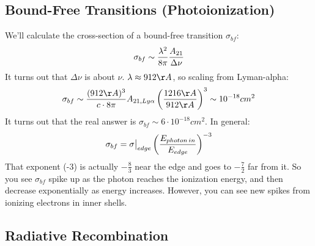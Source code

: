 \documentclass[11pt]{article}
\def\eval#1{\big|_{#1}}
\begin{document}
\subsection*{ Bound-Free Transitions (Photoionization)}

\def\sigbf{\sigma_{bf}}
We'll calculate the cross-section of a bound-free transition $\sigbf$:
$$\sigbf\sim{\lambda^2\over 8\pi}{A_{21}\over \Delta\nu}$$
It turns out that $\Delta\nu$ is about $\nu$. $\lambda\approx 912\AA$, 
so scaling from Lyman-alpha:
$$\sigbf\sim{(912\AA)^3\over c\cdot8\pi}A_{21,Ly\alpha}
\left({1216\AA\over912\AA}\right)^3\sim 10^{-18}cm^2$$
It turns out that the real answer is $\sigbf\sim 6\cdot 10^{-18}cm^2$.  In
general:
$$\sigbf=\sigma\eval{edge}\left({E_{photon\,in}\over E_{edge}}\right)^{-3}$$
That exponent (-3) is actually $-\frac83$ near the edge and goes to $-\frac72$
far from it.  So you see $\sigbf$ spike up as the photon reaches the 
ionization energy, and then decrease exponentially as energy increases.
However, you can see new spikes from ionizing electrons in inner shells.

\subsection*{ Radiative Recombination}
\end{document}
